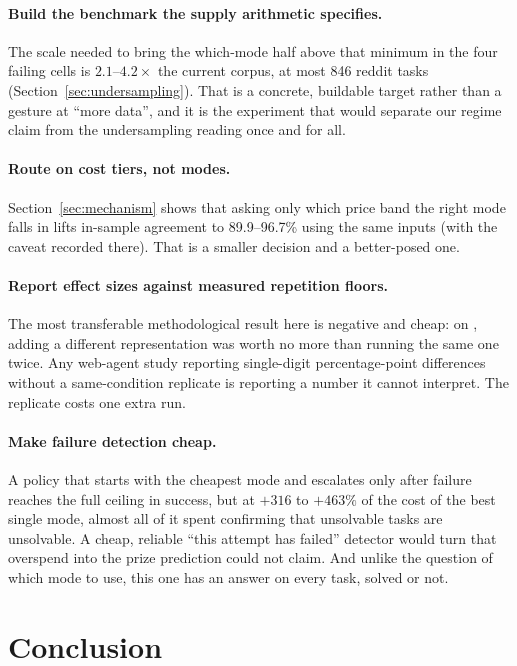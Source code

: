 \paragraph{Build the benchmark the supply arithmetic specifies.} The scale
needed to bring the which-mode half above that minimum in the four failing
cells is $2.1$--$4.2\times$ the current corpus, at most 846 reddit tasks (Section~\ref{sec:undersampling}). That is a concrete, buildable target rather
than a gesture at ``more data'', and it is the experiment that would separate
our regime claim from the undersampling reading once and for all.

\paragraph{Route on cost tiers, not modes.} Section~\ref{sec:mechanism} shows
that asking only which price band the right mode falls in lifts in-sample
agreement to 89.9--96.7\% using the same inputs (with the caveat recorded
there). That is a smaller decision and a
better-posed one.

\paragraph{Report effect sizes against measured repetition floors.} The most
transferable methodological result here is negative and cheap: on
, adding a different representation was worth no more than
running the same one twice. Any web-agent study reporting single-digit
percentage-point differences without a same-condition replicate is reporting a
number it cannot interpret. The replicate costs one extra run.

\paragraph{Make failure detection cheap.} A policy that starts with the
cheapest mode and escalates only after failure reaches the full ceiling in
success, but at $+316$ to $+463\%$ of the cost of the best single mode,
almost all of it spent confirming that unsolvable tasks are unsolvable. A
cheap, reliable ``this attempt has failed'' detector would turn that overspend
into the prize prediction could not claim. And unlike the question of which
mode to use, this one has an answer on every task, solved or not.

\section{Conclusion}
\label{sec:conclusion}

